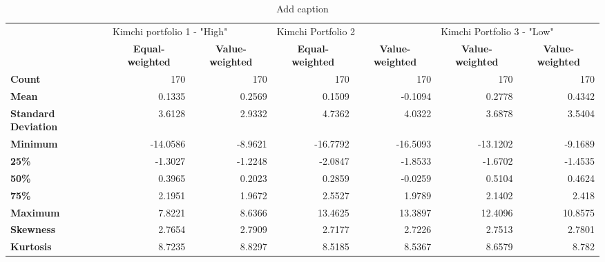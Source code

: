 \documentclass{article}
\begin{document}
\begin{sidewaystable}[htbp]
  \centering
  \caption{Add caption}
    \begin{tabular}{lrrrrrr}
    \toprule
          & \multicolumn{2}{l}{Kimchi portfolio 1 - "High"} & \multicolumn{2}{l}{Kimchi Portfolio 2} & \multicolumn{2}{l}{Kimchi Portfolio 3 - "Low"} \\
\cmidrule{2-7}          & \multicolumn{1}{c}{\textbf{Equal-weighted}} & \multicolumn{1}{c}{\textbf{Value-weighted}} & \multicolumn{1}{c}{\textbf{Equal-weighted}} & \multicolumn{1}{c}{\textbf{Value-weighted}} & \multicolumn{1}{c}{\textbf{Value-weighted}} & \multicolumn{1}{c}{\textbf{Value-weighted}} \\
    \midrule
    \textbf{Count} & 170   & 170   & 170   & 170   & 170   & 170 \\
    \textbf{Mean} & 0.1335 & 0.2569 & 0.1509 & -0.1094 & 0.2778 & 0.4342 \\
    \multicolumn{1}{p{6.22em}}{\textbf{Standard Deviation}} & 3.6128 & 2.9332 & 4.7362 & 4.0322 & 3.6878 & 3.5404 \\
    \textbf{Minimum} & -14.0586 & -8.9621 & -16.7792 & -16.5093 & -13.1202 & -9.1689 \\
    \textbf{25\%} & -1.3027 & -1.2248 & -2.0847 & -1.8533 & -1.6702 & -1.4535 \\
    \textbf{50\%} & 0.3965 & 0.2023 & 0.2859 & -0.0259 & 0.5104 & 0.4624 \\
    \textbf{75\%} & 2.1951 & 1.9672 & 2.5527 & 1.9789 & 2.1402 & 2.418 \\
    \textbf{Maximum} & 7.8221 & 8.6366 & 13.4625 & 13.3897 & 12.4096 & 10.8575 \\
    \textbf{Skewness} & 2.7654 & 2.7909 & 2.7177 & 2.7226 & 2.7513 & 2.7801 \\
    \textbf{Kurtosis} & 8.7235 & 8.8297 & 8.5185 & 8.5367 & 8.6579 & 8.782 \\
    \bottomrule
    \end{tabular}%
  \label{tab:addlabel}%
\end{sidewaystable}%
\end{document}
